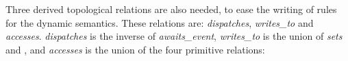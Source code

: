 



Three derived topological relations are also needed, to ease the
writing of rules for the dynamic semantics. These relations are:
\emph{dispatches}, \emph{writes\_to} and
\emph{accesses}. \emph{dispatches} is the inverse of
\emph{awaits\_event}, \emph{writes\_to} is the union of \emph{sets} and
, and \emph{accesses} is the union of the
four primitive relations:

